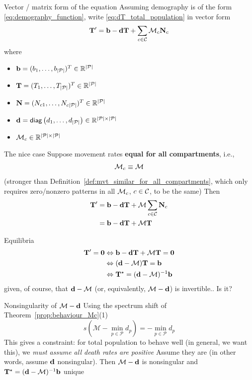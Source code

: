 \documentclass[aspectratio=43]{beamer}
\begin{document}
\begin{frame}{Vector / matrix form of the equation}
Assuming demography is of the form \eqref{eq:demography_function}, write \eqref{eq:dT_total_population} in vector form
\begin{equation}\label{sys:dN_general} 
	\mathbf{T}'=\mathbf{b}-\mathbf{d}\mathbf{T}+\sum_{c\in\mathcal{C}}\mathcal{M}_c\mathbf{N}_{c}	
\end{equation}
where 
\begin{itemize}
	\item $\mathbf{b}=(b_1,\ldots,b_{|\mathcal{P}|})^T\in\mathbb{R}^{|\mathcal{P}|}$
	\item $\mathbf{T}=(T_1,\ldots,T_{|\mathcal{P}|})^T\in\mathbb{R}^{|\mathcal{P}|}$
	\item $\mathbf{N}=(N_{c1},\ldots,N_{c{|\mathcal{P}|}})^T\in\mathbb{R}^{|\mathcal{P}|}$
	\item $\mathbf{d}=\mathsf{diag}\left(d_1,\ldots,d_{|\mathcal{P}|}\right)\in\mathbb{R}^{|\mathcal{P}|\times|\mathcal{P}|}$
	\item $\mathcal{M}_c\in\mathbb{R}^{|\mathcal{P}|\times|\mathcal{P}|}$
\end{itemize}

\end{frame}


\begin{frame}{The nice case}
Suppose movement rates \textbf{equal for all compartments}, i.e.,
$$
\mathcal{M}_c\equiv\mathcal{M}
$$
\vfill
(stronger than Definition~\ref{def:mvt_similar_for_all_compartments}, which only requires zero/nonzero patterns in all $\mathcal{M}_c$, $c\in\mathcal{C}$, to be the same)
\vfill
Then
\begin{align}
\mathbf{T}' &= \mathbf{b}-\mathbf{d}\mathbf{T}+\mathcal{M}\sum_{c\in\mathcal{C}}\mathbf{N}_{c} \nonumber \\
&= \mathbf{b}-\mathbf{d}\mathbf{T}+\mathcal{M}\mathbf{T} \label{sys:pSLIRS_toy_dN}
\end{align}
\end{frame}


\begin{frame}{Equilibria}
$$
\begin{aligned}
\bT'=\b0 &\Leftrightarrow \mathbf{b}-\bd\mathbf{T}+\mathcal{M}\mathbf{T}=\mathbf{0} \\
&\Leftrightarrow (\bd-\mathcal{M})\mathbf{T}=\mathbf{b} \\
&\Leftrightarrow \mathbf{T}^\star=(\bd-\mathcal{M})^{-1}\mathbf{b}
\end{aligned}
$$
given, of course, that $\mathbf{d}-\mathcal{M}$ (or, equivalently, $\mathcal{M}-\mathbf{d}$) is invertible.. 
\vfill
Is it?
\end{frame}

\begin{frame}{Nonsingularity of $\mathcal{M}-\mathbf{d}$}
Using the spectrum shift of Theorem~\ref{prop:behaviour_Mc}{(1)}
\[
s\left(\mathcal{M}-\min_{p\in\mathcal{P}}d_p\right)=-\min_{p\in\mathcal{P}}d_p
\]
This gives a constraint: for total population to behave well (in general, we want this), we \emph{must assume all death rates are positive}
\vfill
Assume they are (in other words, assume $\mathbf{d}$ nonsingular). Then $\mathcal{M}-\mathbf{d}$ is nonsingular and $\mathbf{T}^\star=(\mathbf{d}-\mathcal{M})^{-1}\mathbf{b}$ unique
\end{frame}
\end{document}
